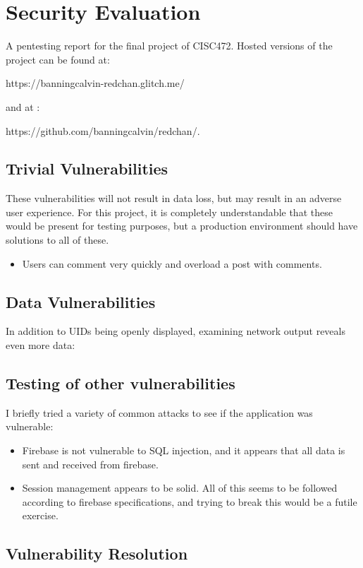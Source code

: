 %
%
\chapter{Security Evaluation}
A pentesting report for the final project of CISC472. Hosted versions of the project can be found at:

https://banningcalvin-redchan.glitch.me/

and at :

https://github.com/banningcalvin/redchan/.


\section{Trivial Vulnerabilities}
These vulnerabilities will not result in data loss, but may result in an adverse user experience. For this project, it is completely understandable that these would be present for testing purposes, but a production environment should have solutions to all of these.
\begin{itemize}
    \item Users can comment very quickly and overload a post with comments.
\end{itemize}

\section{Data Vulnerabilities}
In addition to UIDs being openly displayed, examining network output reveals even more data:

\section{Testing of other vulnerabilities}
I briefly tried a variety of common attacks to see if the application was vulnerable:
\begin{itemize}
    \item Firebase is not vulnerable to SQL injection, and it appears that all data is sent and received from firebase.
    \item Session management appears to be solid. All of this seems to be followed according to firebase specifications, and trying to break this would be a futile exercise.
\end{itemize}

\section{Vulnerability Resolution}

